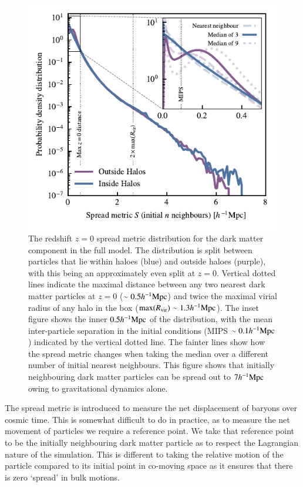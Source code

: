 \begin{figure}
    \centering
    \includegraphics{figures/s50j7kAHF/dark_matter_distance_figure_s50j7k_AHF}
    \vspace{-0.5cm}
    \caption{The redshift $z=0$ spread metric distribution for the dark
    matter component in the full \simba{} model. The distribution is split
    between particles that lie within haloes (blue) and outside haloes
    (purple), with this being an approximately even split at $z=0$. Vertical
    dotted lines indicate the maximal distance between any two nearest dark
    matter particles at $z=0$ ($\sim 0.5h^{-1}{\rm Mpc}{}$) and twice the maximal
    virial radius of any halo in the box (${\rm max}(R_{\rm vir}) \sim
    1.3h^{-1}{\rm Mpc}{}$). The inset figure shows the inner $0.5h^{-1}{\rm Mpc}{}$ of the
    distribution, with the mean inter-particle separation in the initial
    conditions (MIPS $\sim 0.1h^{-1}{\rm Mpc}$) indicated by the vertical dotted line.
    The fainter lines show how the spread metric changes when taking the
    median over a different number of initial nearest neighbours.
    This figure shows that initially neighbouring dark matter particles
    can be spread out to $7h^{-1}{\rm Mpc}{}$ owing to gravitational dynamics alone.}
    \vspace{-0.5cm}
    \label{fig:dmonlyspread}
\end{figure}


The spread metric is introduced to measure the net displacement of baryons over
cosmic time. This is somewhat difficult to do in practice, as to measure the
net movement of particles we require a reference point. We take that
reference point to be the initially neighbouring dark matter particle as to
respect the Lagrangian nature of the simulation. This is different to taking the
relative motion of the particle compared to its initial point in co-moving space
as it ensures that there is zero `spread' in bulk motions.

